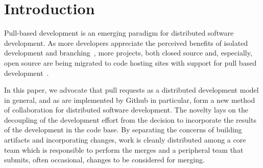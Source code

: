 \documentclass{sig-alternate}
\begin{document}


\section{Introduction}

%


Pull-based development is an emerging paradigm for distributed software
development. As more developers appreciate the perceived benefits of isolated
development and branching~\cite{Bird12}, more projects, both closed source and,
especially, open source are being migrated to code hosting sites with support
for pull based development~\cite{Barr12}.

In this paper, we advocate that pull requests as a distributed development model
in general, and as are implemented by Github in particular, form a new method of
collaboration for distributed software development. The novelty lays on the
decoupling of the development effort from the decision to incorporate the
results of the development in the code base.  By separating the concerns of
building artifacts and incorporating changes, work is cleanly distributed among
a core team which is responsible to perform the merges and a peripheral team
that submits, often occasional, changes to be considered for merging.
\end{document}
